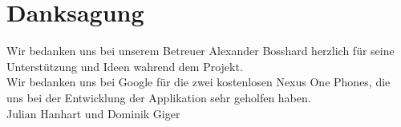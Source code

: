 \chapter*{Danksagung}
Wir bedanken uns bei unserem Betreuer Alexander Bosshard herzlich für seine Unterstützung und Ideen wahrend dem Projekt.\\

Wir bedanken uns bei Google für die zwei kostenlosen Nexus One Phones, die uns bei der Entwicklung der Applikation sehr geholfen haben. \\

Julian Hanhart und Dominik Giger

